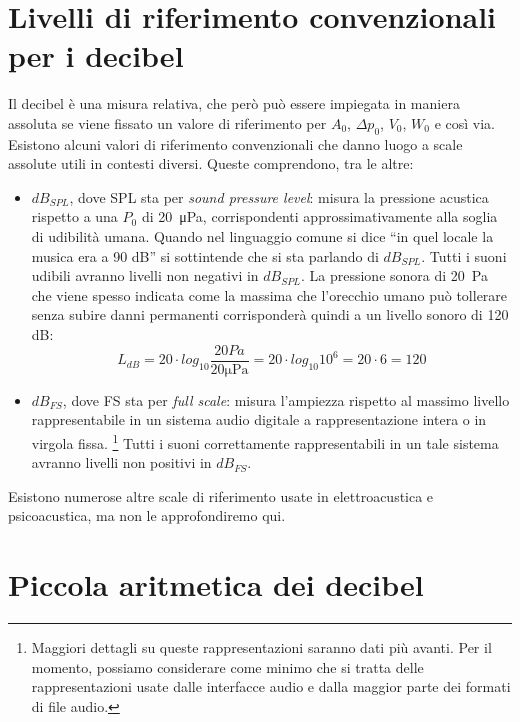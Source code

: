 \section{Livelli di riferimento convenzionali per i decibel}

Il decibel è una misura relativa, che però può essere impiegata in maniera assoluta se viene fissato un valore di riferimento per $A_0$, $\Delta p_0$, $V_0$, $W_0$ e così via. Esistono alcuni valori di riferimento convenzionali che danno luogo a scale assolute utili in contesti diversi. Queste comprendono, tra le altre:

\begin{itemize}

\item{$dB_{SPL}$}, dove SPL sta per \emph{sound pressure level}: misura la pressione acustica rispetto a una $P_0$ di \qty{20}{\micro\pascal}, corrispondenti approssimativamente alla soglia di udibilità umana. Quando nel linguaggio comune si dice ``in quel locale la musica era a 90 dB'' si sottintende che si sta parlando di $dB_{SPL}$. Tutti i suoni udibili avranno livelli non negativi in $dB_{SPL}$. La pressione sonora di \qty{20}{\pascal} che viene spesso indicata come la massima che l'orecchio umano può tollerare senza subire danni permanenti corrisponderà quindi a un livello sonoro di 120 dB:
\begin{equation}
L_{dB} = 20 \cdot log_{10}\frac{20 \unit{Pa}}{20 \unit{\micro\pascal}} = 20 \cdot log_{10}10^6 = 20 \cdot 6 = 120
\end{equation}

\item{$dB_{FS}$}, dove FS sta per \emph{full scale}: misura l'ampiezza rispetto al massimo livello rappresentabile in un sistema audio digitale a rappresentazione intera o in virgola fissa.%
\footnote{Maggiori dettagli su queste rappresentazioni saranno dati più avanti. Per il momento, possiamo considerare come minimo che si tratta delle rappresentazioni usate dalle interfacce audio e dalla maggior parte dei formati di file audio.}
Tutti i suoni correttamente rappresentabili in un tale sistema avranno livelli non positivi in $dB_{FS}$.

\end{itemize}

Esistono numerose altre scale di riferimento usate in elettroacustica e psicoacustica, ma non le approfondiremo qui.




\section{Piccola aritmetica dei decibel}

